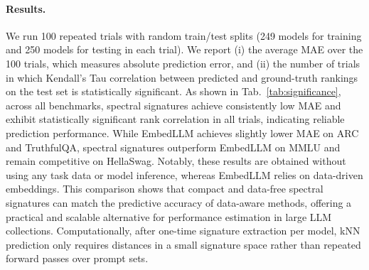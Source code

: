 \paragraph{Results.}
We run 100 repeated trials with random train/test splits (249 models for training and 250 models for testing in each trial). 
We report (i) the average MAE over the 100 trials, which measures absolute prediction error, and (ii) the number of trials in which Kendall's Tau correlation between predicted and ground-truth rankings on the test set is statistically significant. As shown in Tab.~\ref{tab:significance}, across all benchmarks, spectral signatures achieve consistently low MAE and exhibit statistically significant rank correlation in all trials, indicating reliable prediction performance. While EmbedLLM achieves slightly lower MAE on ARC and TruthfulQA, spectral signatures outperform EmbedLLM on MMLU and remain competitive on HellaSwag. Notably, these results are obtained without using any task data or model inference, whereas EmbedLLM relies on data-driven embeddings. This comparison shows that compact and data-free spectral signatures can match the predictive accuracy of data-aware methods, offering a practical and scalable alternative for performance estimation in large LLM collections.  Computationally, after one-time signature extraction per model, kNN prediction only requires distances in a small signature space rather than repeated forward passes over prompt sets.


